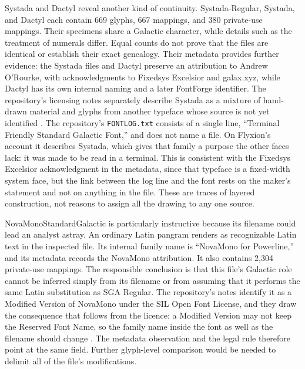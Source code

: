 \documentclass[11pt]{article}
\begin{document}
Systada and Dactyl reveal another kind of continuity. Systada-Regular, Systada, and Dactyl each contain 669 glyphs, 667 mappings, and 380 private-use mappings. Their specimens share a Galactic character, while details such as the treatment of numerals differ. Equal counts do not prove that the files are identical or establish their exact genealogy. Their metadata provides further evidence: the Systada files and Dactyl preserve an attribution to Andrew O'Rourke, with acknowledgments to Fixedsys Excelsior and galax.xyz, while Dactyl has its own internal naming and a later FontForge identifier. The repository's licensing notes separately describe Systada as a mixture of hand-drawn material and glyphs from another typeface whose source is not yet identified \cite{repo}. The repository's \texttt{FONTLOG.txt} consists of a single line, ``Terminal Friendly Standard Galactic Font,'' and does not name a file. On Flyxion's account it describes Systada, which gives that family a purpose the other faces lack: it was made to be read in a terminal. This is consistent with the Fixedsys Excelsior acknowledgment in the metadata, since that typeface is a fixed-width system face, but the link between the log line and the font rests on the maker's statement and not on anything in the file. These are traces of layered construction, not reasons to assign all the drawing to any one source.

NovaMonoStandardGalactic is particularly instructive because its filename could lead an analyst astray. An ordinary Latin pangram renders as recognizable Latin text in the inspected file. Its internal family name is ``NovaMono for Powerline,'' and its metadata records the NovaMono attribution. It also contains 2,304 private-use mappings. The responsible conclusion is that this file's Galactic role cannot be inferred simply from its filename or from assuming that it performs the same Latin substitution as SGA Regular. The repository's notes identify it as a Modified Version of NovaMono under the SIL Open Font License, and they draw the consequence that follows from the licence: a Modified Version may not keep the Reserved Font Name, so the family name inside the font as well as the filename should change \cite{repo}. The metadata observation and the legal rule therefore point at the same field. Further glyph-level comparison would be needed to delimit all of the file's modifications.
\end{document}
